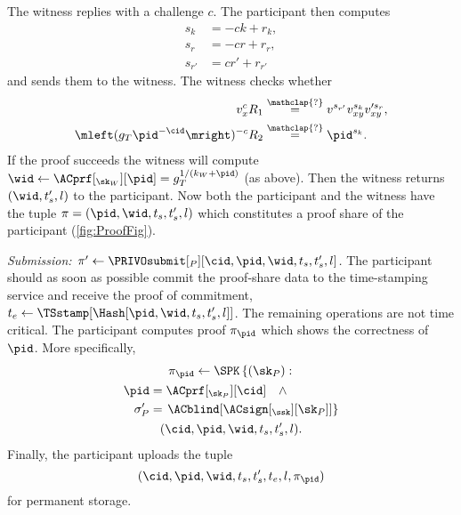 The witness replies with a challenge \(c\).
The participant then computes
\begin{align*}
s_k &= -ck + r_k, \\
s_r &= -cr + r_r, \\
s_{r'} &= cr' + r_{r'}
\end{align*}
and sends them to the witness.
The witness checks whether
\begin{align*}
  v_x^c R_1 &\overset{\mathclap{?}}{=} v^{s_{r'}} v_{xy}^{s_k} v_{xy}^{\prime 
    s_r}, \\
  \mleft(g_T \pid^{-\cid}\mright)^{-c} R_2 &\overset{\mathclap{?}}{=} 
  \pid^{s_k}.
\end{align*}
If the proof succeeds the witness will compute \(\wid\gets 
  \ACprf[_{\sk_W}][\pid] = g_T^{1/(k_W+\pid)}\) (as above).
Then the witness returns \((\wid, t_s', l)\) to the participant.
Now both the participant and the witness have the tuple \(\pi = (\pid, \wid, 
  t_s, t_s', l)\) which constitutes a proof share of the participant 
(\cref{fig:ProofFig}).


\emph{Submission: \(\pi'\gets \PRIVOsubmit[_P][\cid, \pid, \wid, t_s, t_s', 
    l]\).}
The participant should as soon as possible commit the proof-share data to the 
time-stamping service and receive the proof of commitment, \(t_e\gets 
  \TSstamp[\Hash[\pid, \wid, t_s, t_s', l]]\).
The remaining operations are not time critical.
The participant computes  proof \(\pi_{\pid}\) which shows the 
correctness of \(\pid\).
More specifically,
\begin{multline*}
  \pi_{\pid}\gets \SPK\left\{ (\sk_P) : \right. \\
    \begin{aligned}
      \pid &= \ACprf[_{\sk_P}][\cid] \quad \land \\
      \sigma_P' &= \left. \ACblind[\ACsign[_{\ssk}][\sk_P]] \right\}
    \end{aligned} \\
      (\cid, \pid, \wid, t_s, t_s', l).
\end{multline*}
Finally, the participant uploads the tuple \[
  (\cid, \pid, \wid, t_s, t_s', t_e, l, \pi_{\pid})
\] for permanent storage.

